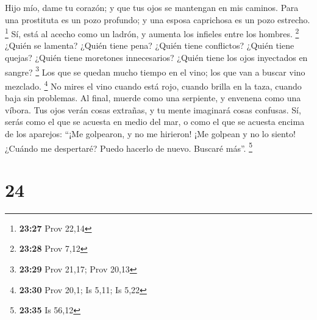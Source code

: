Hijo mío, dame tu corazón; y que tus ojos se mantengan en mis caminos.
 Para una prostituta es un pozo profundo; y una esposa
caprichosa es un pozo estrecho. \footnote{\textbf{23:27} Prov 22,14}
 Sí, está al acecho como un ladrón, y aumenta los
infieles entre los hombres. \footnote{\textbf{23:28} Prov 7,12}
 ¿Quién se lamenta? ¿Quién tiene pena? ¿Quién tiene
conflictos? ¿Quién tiene quejas? ¿Quién tiene moretones innecesarios?
¿Quién tiene los ojos inyectados en sangre? \footnote{\textbf{23:29}
  Prov 21,17; Prov 20,13}  Los que se quedan mucho tiempo
en el vino; los que van a buscar vino mezclado. \footnote{\textbf{23:30}
  Prov 20,1; Is 5,11; Is 5,22}  No mires el vino cuando
está rojo, cuando brilla en la taza, cuando baja sin problemas.
 Al final, muerde como una serpiente, y envenena como una
víbora.  Tus ojos verán cosas extrañas, y tu mente
imaginará cosas confusas.  Sí, serás como el que se
acuesta en medio del mar, o como el que se acuesta encima de los
aparejos:  ``¡Me golpearon, y no me hirieron! ¡Me golpean
y no lo siento! ¿Cuándo me despertaré? Puedo hacerlo de nuevo. Buscaré
más''. \footnote{\textbf{23:35} Is 56,12}

\hypertarget{section-23}{%
\section{24}\label{section-23}}


